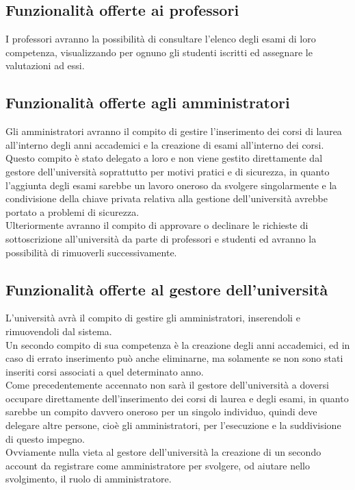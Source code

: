 \documentclass[AnalisiDeiRequisiti.tex]{subfiles}
\begin{document}
\subsection{Funzionalità offerte ai professori}
I professori avranno la possibilità di consultare l'elenco degli esami di loro competenza, visualizzando per ognuno gli studenti iscritti ed assegnare le valutazioni ad essi.

\subsection{Funzionalità offerte agli amministratori}
Gli amministratori avranno il compito di gestire l'inserimento dei corsi di laurea all'interno degli anni accademici e la creazione di esami all'interno dei corsi.\\
Questo compito è stato delegato a loro e non viene gestito direttamente dal gestore dell'università soprattutto per motivi pratici e di sicurezza, in quanto l'aggiunta degli esami sarebbe un lavoro oneroso da svolgere singolarmente e la condivisione della chiave privata relativa alla gestione dell'università avrebbe portato a problemi di sicurezza.\\
Ulteriormente avranno il compito di approvare o declinare le richieste di sottoscrizione all'università da parte di professori e studenti ed avranno la possibilità di rimuoverli successivamente.


\subsection{Funzionalità offerte al gestore dell'università}
L'università avrà il compito di gestire gli amministratori, inserendoli e rimuovendoli dal sistema.\\
Un secondo compito di sua competenza è la creazione degli anni accademici, ed in caso di errato inserimento può anche eliminarne, ma solamente se non sono stati inseriti corsi associati a quel determinato anno.\\
Come precedentemente accennato non sarà il gestore dell'università a doversi occupare direttamente dell'inserimento dei corsi di laurea e degli esami, in quanto sarebbe un compito davvero oneroso per un singolo individuo, quindi deve delegare altre persone, cioè gli amministratori, per l'esecuzione e la suddivisione di questo impegno.\\
Ovviamente nulla vieta al gestore dell'università la creazione di un secondo account da registrare come amministratore per svolgere, od aiutare nello svolgimento, il ruolo di amministratore.
\end{document}

